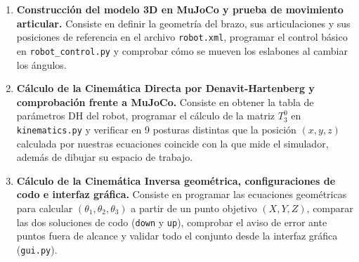 \documentclass[11pt,a4paper]{article}
\begin{document}
\begin{enumerate}
    \item \textbf{Construcción del modelo 3D en MuJoCo y prueba de movimiento articular.} Consiste en definir la geometría del brazo, sus articulaciones y sus posiciones de referencia en el archivo \texttt{robot.xml}, programar el control básico en \texttt{robot\_control.py} y comprobar cómo se mueven los eslabones al cambiar los ángulos.
    \item \textbf{Cálculo de la Cinemática Directa por Denavit-Hartenberg y comprobación frente a MuJoCo.} Consiste en obtener la tabla de parámetros DH del robot, programar el cálculo de la matriz $T_3^0$ en \texttt{kinematics.py} y verificar en 9 posturas distintas que la posición $(x, y, z)$ calculada por nuestras ecuaciones coincide con la que mide el simulador, además de dibujar su espacio de trabajo.
    \item \textbf{Cálculo de la Cinemática Inversa geométrica, configuraciones de codo e interfaz gráfica.} Consiste en programar las ecuaciones geométricas para calcular $(\theta_1, \theta_2, \theta_3)$ a partir de un punto objetivo $(X, Y, Z)$, comparar las dos soluciones de codo (\texttt{down} y \texttt{up}), comprobar el aviso de error ante puntos fuera de alcance y validar todo el conjunto desde la interfaz gráfica (\texttt{gui.py}).
\end{enumerate}

\end{document}

